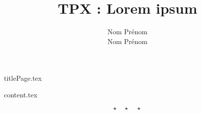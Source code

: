\documentclass{rUTT}
\title{TPX : Lorem ipsum}
\author{{\sc Nom} Prénom \\ {\sc Nom} Prénom}
\begin{document}
    {titlePage.tex}
    \tableofcontents{} %


    \thispagestyle{empty}
    \setcounter{page}{0} %
    \newpage


    {content.tex}

    \[ \star \quad \star \quad \star \]
\end{document}

